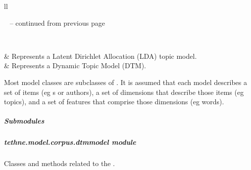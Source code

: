 \documentclass[letterpaper,10pt,english]{sphinxmanual}
\begin{document}
\begin{longtable}{ll}
\hline
\endfirsthead

%
{{\textsf{\tablename\ \thetable{} -- continued from previous page}}} \\
\hline
\endhead

\hline {} \\ \hline
\endfoot

\endlastfoot


{\hyperref[tethne.model.corpus.ldamodel:tethne.model.corpus.ldamodel.LDAModel]{}}
 & 
Represents a Latent Dirichlet Allocation (LDA) topic model.
\\

{\hyperref[tethne.model.corpus.dtmmodel:tethne.model.corpus.dtmmodel.DTMModel]{}}
 & 
Represents a Dynamic Topic Model (DTM).
\\
\hline\end{longtable}


Most model classes are subclasses of {\hyperref[tethne.model.basemodel:tethne.model.basemodel.BaseModel]{}}. It is assumed that
each model describes a set of items (eg {\hyperref[tethne.classes.paper:tethne.classes.paper.Paper]{}}s or authors), a set 
of dimensions that describe those items (eg topics), and a set of features 
that comprise those dimensions (eg words).


\subparagraph{Submodules}
\label{tethne.model.corpus:submodules}

\subparagraph{tethne.model.corpus.dtmmodel module}
\label{tethne.model.corpus.dtmmodel:module-tethne.model.corpus.dtmmodel}\label{tethne.model.corpus.dtmmodel:tethne-model-corpus-dtmmodel-module}\label{tethne.model.corpus.dtmmodel::doc}
Classes and methods related to the {\hyperref[tethne.model.corpus.dtmmodel:tethne.model.corpus.dtmmodel.DTMModel]{}}.
\end{document}
